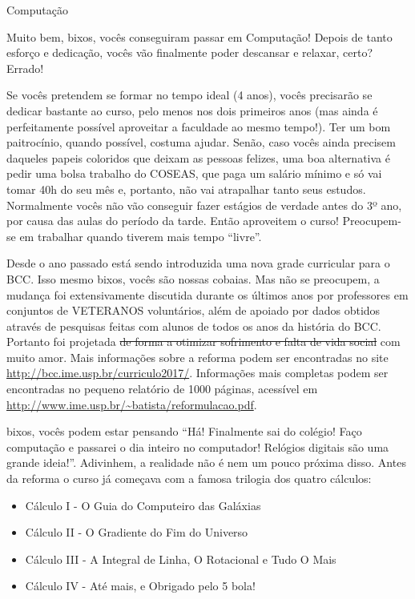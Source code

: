 \begin{subsecao}{Computação}

Muito bem, bixos, vocês conseguiram passar em Computação! Depois de tanto
esforço e dedicação, vocês vão finalmente poder descansar e relaxar, certo?
Errado!

Se vocês pretendem se formar no tempo ideal (4 anos), vocês precisarão se
dedicar bastante ao curso, pelo menos nos dois primeiros anos (mas ainda é
perfeitamente possível aproveitar a faculdade ao mesmo tempo!). Ter um bom
paitrocínio, quando possível, costuma ajudar. Senão, caso vocês ainda precisem
daqueles papeis coloridos que deixam as pessoas felizes, uma boa alternativa é
pedir uma bolsa trabalho do COSEAS, que paga um salário mínimo e só vai tomar
40h do seu mês e, portanto, não vai atrapalhar tanto seus estudos. Normalmente
vocês não vão conseguir fazer estágios de verdade antes do 3º ano, por causa
das aulas do período da tarde. Então aproveitem o curso! Preocupem-se em
trabalhar quando tiverem mais tempo ``livre''.

Desde o ano passado está sendo introduzida uma nova grade curricular para o
BCC. Isso mesmo bixos, vocês são nossas cobaias. Mas não se preocupem, a
mudança foi extensivamente discutida durante os últimos anos por professores em
conjuntos de VETERANOS voluntários, além de apoiado por dados obtidos através de
pesquisas feitas com alunos de todos os anos da história do BCC. Portanto foi
projetada \sout{de forma a otimizar sofrimento e falta de vida social} com muito
amor. Mais informações sobre a reforma podem ser encontradas no site
\url{http://bcc.ime.usp.br/curriculo2017/}. Informações mais completas podem ser
encontradas no pequeno relatório de 1000 páginas, acessível em
\url{http://www.ime.usp.br/~batista/reformulacao.pdf}.

bixos, vocês podem estar pensando ``Há! Finalmente sai do colégio! Faço
computação e passarei o dia inteiro no computador! Relógios digitais são uma
grande ideia!''. Adivinhem, a realidade não é nem um pouco próxima disso. Antes
da reforma o curso já começava com a famosa trilogia dos quatro cálculos:

\begin{itemize}
\item Cálculo I - O Guia do Computeiro das Galáxias
\item Cálculo II - O Gradiente do Fim do Universo
\item Cálculo III - A Integral de Linha, O Rotacional e Tudo O Mais
\item Cálculo IV - Até mais, e Obrigado pelo 5 bola!
\end{itemize}


\end{subsecao}
